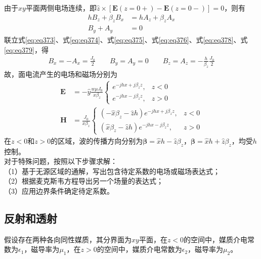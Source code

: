 \documentclass{article}
\numberwithin{equation}{section}
\renewcommand{\vec}[1]{\boldsymbol{#1}}
\begin{document}
由于$xy$平面两侧电场连续，即$\hat{z}\times[\mathbf{E}(z=0+)-\mathbf{E}(z=0-)]=0$，则有
\begin{align}
    \label{eq:eq378}
    hB_z+\beta_zB_x&=hA_z+\beta_zA_x \\
    \label{eq:eq379}
    B_y+A_y&=0
\end{align}
联立式\ref{eq:eq373}、式\ref{eq:eq374}、式\ref{eq:eq375}、式\ref{eq:eq376}、式\ref{eq:eq378}、式\ref{eq:eq379}，得
\begin{align}
    \label{eq:eq380}
    B_x=-A_x=\frac{J_0}{2}\qquad B_y=A_y=0\qquad B_z=A_z=-\frac{h}{\beta_z}\frac{J_0}{2}
\end{align}
故，面电流产生的电场和磁场分别为
\begin{align}
    \label{eq:eq381}
    \mathbf{E}&=-\hat{y}\frac{w\mu J_0}{x\beta_z}
    \left\{
        \begin{array}{lr}
            e^{-jhx+j\beta_zz}, &z<0 \\
            e^{-jhx-j\beta_zz}, &z>0
        \end{array}
    \right. \\
    \label{eq:eq382}
    \mathbf{H}&=\frac{J_0}{x\beta_z}
    \left\{
        \begin{array}{lr}
            (-\hat{x}\beta_z-\hat{z}h)e^{-jhx+j\beta_zz}, &z<0 \\
            (\hat{x}\beta_z-\hat{z}h)e^{-jhx-j\beta_zz}, &z>0
        \end{array}
    \right.
\end{align}
在$z<0$和$z>0$的区域，波的传播方向分别为$\vec{\beta}=\hat{x}h-\hat{z}\beta_z$，$\vec{\beta}=\hat{x}h+\hat{z}\beta_z$，均受$h$控制。\\
对于特殊问题，按照以下步骤求解： \\
（1）基于无源区域的通解，写出包含待定系数的电场或磁场表达式； \\
（2）根据麦克斯韦方程导出另一个场量的表达式； \\
（3）应用边界条件确定待定系数。 \\
\subsection{反射和透射}
假设存在两种各向同性媒质，其分界面为$xy$平面，在$z<0$的空间中，媒质介电常数为$\epsilon_1$，磁导率为$\mu_1$，在$z>0$的空间中，媒质介电常数为$\epsilon_2$，磁导率为$\mu_2$。
\end{document}
